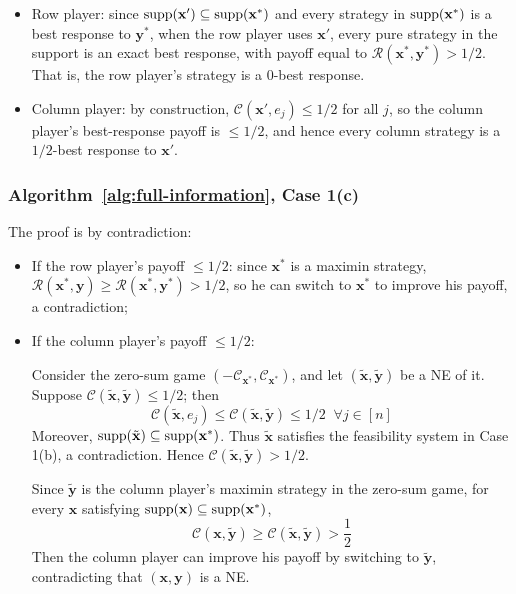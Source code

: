 \begin{itemize}
  \item Row player: since \(\operatorname{supp}(\mathbf{x}') \subseteq \operatorname{supp}(\mathbf{x}^*)\) and every strategy in \(\operatorname{supp}(\mathbf{x}^*)\) is a best response to \(\mathbf{y}^*\), when the row player uses \(\mathbf{x}'\), every pure strategy in the support is an exact best response, with payoff equal to \(\mathcal{R}(\mathbf{x}^*, \mathbf{y}^*) > 1/2\). That is, the row player's strategy is a \(0\)-best response.
  \item Column player: by construction, \(\mathcal{C}(\mathbf{x}', e_j) \le 1/2\) for all \(j\), so the column player's best-response payoff is \(\le 1/2\), and hence every column strategy is a \(1/2\)-best response to \(\mathbf{x}'\).
\end{itemize}

\subsubsection{Algorithm~\ref{alg:full-information}, Case 1(c)}
\label{app:case-one-both-high}

The proof is by contradiction:

\begin{itemize}
  \item If the row player's payoff \(\le 1/2\): since \(\mathbf{x}^*\) is a maximin strategy, \(\mathcal{R}(\mathbf{x}^*, \mathbf{y}) \ge \mathcal{R}(\mathbf{x}^*, \mathbf{y}^*) > 1/2\), so he can switch to \(\mathbf{x}^*\) to improve his payoff, a contradiction;

  \item If the column player's payoff \(\le 1/2\):

        Consider the zero-sum game \((-\mathcal{C}_{\mathbf{x}^*}, \mathcal{C}_{\mathbf{x}^*})\), and let \((\tilde{\mathbf{x}}, \tilde{\mathbf{y}})\) be a NE of it. Suppose \(\mathcal{C}(\tilde{\mathbf{x}}, \tilde{\mathbf{y}}) \le 1/2\); then
        \[
          \mathcal{C}(\tilde{\mathbf{x}}, e_j) \le \mathcal{C}(\tilde{\mathbf{x}}, \tilde{\mathbf{y}}) \le 1/2 \;\; \forall j \in [n]
        \]
        Moreover, \(\operatorname{supp}(\tilde{\mathbf{x}}) \subseteq \operatorname{supp}(\mathbf{x}^*)\). Thus \(\tilde{\mathbf{x}}\) satisfies the feasibility system in Case 1(b), a contradiction. Hence \(\mathcal{C}(\tilde{\mathbf{x}}, \tilde{\mathbf{y}}) > 1/2\).

        Since \(\tilde{\mathbf{y}}\) is the column player's maximin strategy in the zero-sum game, for every \(\mathbf{x}\) satisfying \(\operatorname{supp}(\mathbf{x}) \subseteq \operatorname{supp}(\mathbf{x}^*)\),
        \[
          \mathcal{C}(\mathbf{x}, \tilde{\mathbf{y}}) \ge \mathcal{C}(\tilde{\mathbf{x}}, \tilde{\mathbf{y}}) > \frac{1}{2}
        \]
        Then the column player can improve his payoff by switching to \(\tilde{\mathbf{y}}\), contradicting that \((\mathbf{x}, \mathbf{y})\) is a NE.
\end{itemize}

